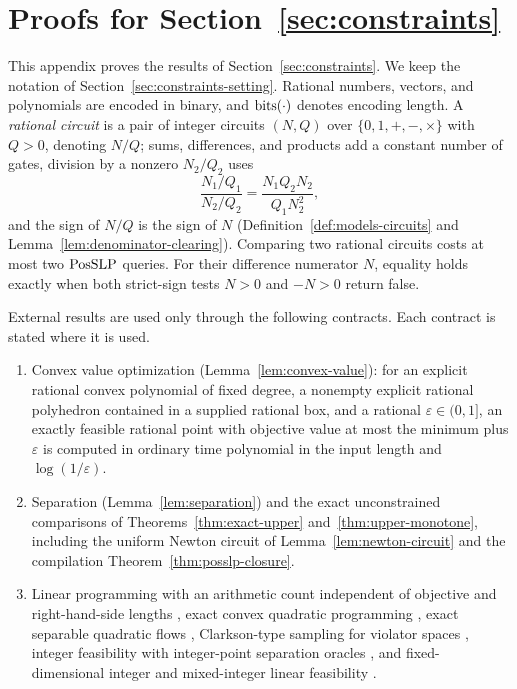 \section{Proofs for Section~\ref{sec:constraints}}
\label{app:constraints}

This appendix proves the results of Section~\ref{sec:constraints}. We keep
the notation of Section~\ref{sec:constraints-setting}. Rational numbers,
vectors, and polynomials are encoded in binary, and $\operatorname{bits}(\cdot)$ denotes
encoding length. A \emph{rational circuit} is a pair of integer circuits
$(N,Q)$ over $\{0,1,+,-,\times\}$ with $Q>0$, denoting $N/Q$; sums,
differences, and products add a constant number of gates, division by a
nonzero $N_2/Q_2$ uses
\[
 \frac{N_1/Q_1}{N_2/Q_2}=\frac{N_1Q_2N_2}{Q_1N_2^2},
\]
and the sign of $N/Q$ is the sign of $N$ (Definition~\ref{def:models-circuits} and Lemma~\ref{lem:denominator-clearing}).
Comparing two rational circuits costs at most two $\mathrm{PosSLP}$ queries. For
their difference numerator $N$, equality holds exactly when both strict-sign
tests $N>0$ and $-N>0$ return false.

External results are used only through the following contracts. Each
contract is stated where it is used.
\begin{enumerate}[label=(E\arabic*)]
\item Convex value optimization (Lemma~\ref{lem:convex-value}): for an
explicit rational convex polynomial of fixed degree, a nonempty explicit
rational polyhedron contained in a supplied rational box, and a rational
$\varepsilon\in(0,1]$, an exactly feasible rational point with objective value
at most the minimum plus $\varepsilon$ is computed in ordinary time polynomial
in the input length and $\log(1/\varepsilon)$.
\item Separation (Lemma~\ref{lem:separation}) and the exact unconstrained
comparisons of Theorems~\ref{thm:exact-upper} and~\ref{thm:upper-monotone},
including the uniform Newton circuit of Lemma~\ref{lem:newton-circuit} and
the compilation Theorem~\ref{thm:posslp-closure}.
\item Linear programming with an arithmetic count independent of objective
and right-hand-side lengths
\citep[Theorem~6.6.3]{GroetschelLovaszSchrijver1988}, exact convex quadratic
programming \citep{KozlovTarasovKhachiyan1980}, exact separable quadratic
flows \citep[Theorem~20]{Vegh2016}, Clarkson-type sampling for violator spaces
\citep{GaertnerMatousekRuestSkovron2008}, integer feasibility with
integer-point separation oracles \citep{AriHildebrand2026,HildebrandGoess2024,Basu2023Integers},
and fixed-dimensional integer and mixed-integer linear feasibility
\citep{HildebrandKoeppe2013,DelPia2023}.
\end{enumerate}

